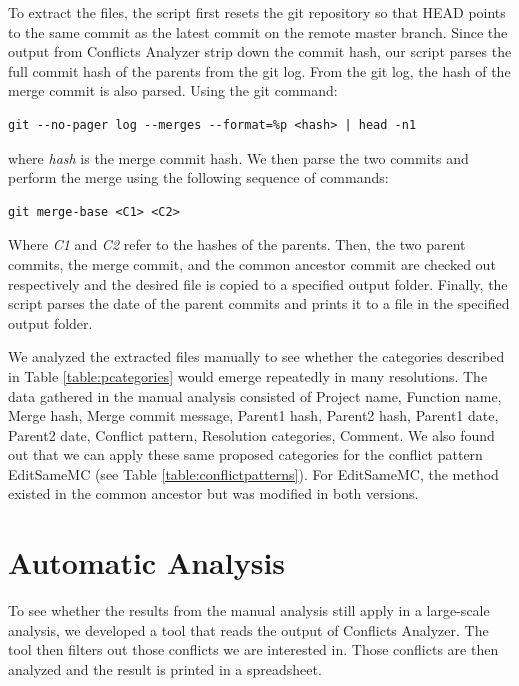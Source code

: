 {To extract the files, the script first resets the git repository so that HEAD points to the same commit as the latest commit on the remote master branch. Since the output from Conflicts Analyzer strip down the commit hash, our script parses the full commit hash of the parents from the git log. From the git log, the hash of the merge commit is also parsed. Using the git command:
\lstset{language=Bash,numbers=left,xleftmargin=2em,frame=single,framexleftmargin=1.5em}
\begin{lstlisting}[frame=single,breaklines=true,tabsize=2]
git --no-pager log --merges --format=%p <hash> | head -n1
\end{lstlisting}
where \textit{hash} is the merge commit hash. We then parse the two commits and perform the merge using the following sequence of commands:\\
\lstset{language=Bash,numbers=left,xleftmargin=2em,frame=single,framexleftmargin=1.5em}
\begin{lstlisting}[frame=single,breaklines=true,tabsize=2]
git merge-base <C1> <C2>
\end{lstlisting}
Where \textit{C1} and \textit{C2} refer to the hashes of the parents.  Then, the two parent commits, the merge commit, and the common ancestor commit are checked out respectively and the desired file is copied to a specified output folder. Finally, the script parses the date of the parent commits and prints it to a file in the specified output folder.

We analyzed the extracted files manually to see whether the categories described in Table \ref{table:pcategories} would emerge repeatedly in many resolutions. The data gathered in the manual analysis consisted of Project name, Function name, Merge hash, Merge commit message, Parent1 hash, Parent2 hash, Parent1 date, Parent2 date, Conflict pattern, Resolution categories, Comment. We also found out that we can apply these same proposed categories for the conflict pattern EditSameMC (see Table \ref{table:conflictpatterns}). For EditSameMC, the method existed in the common ancestor but was modified in both versions.
\FloatBarrier
\section{Automatic Analysis}
To see whether the results from the manual analysis still apply in a large-scale analysis, we developed a tool that reads the output of Conflicts Analyzer. The tool then filters out those conflicts we are interested in. Those conflicts are then analyzed and the result is printed in a spreadsheet.

}
